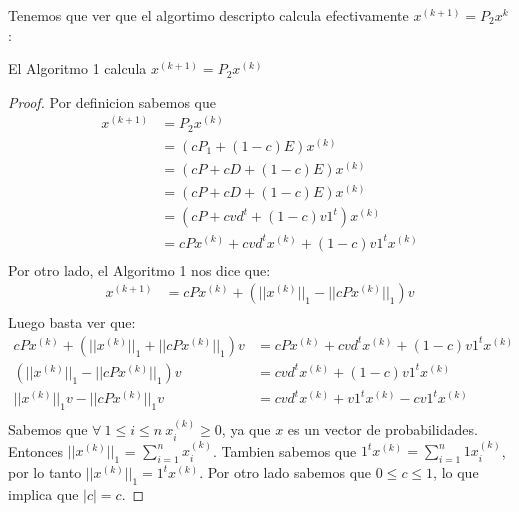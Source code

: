 Tenemos que ver que el algortimo descripto calcula efectivamente $x^{(k+1)} = P_2x^{k}$:
\begin{proposition}
    El Algoritmo 1 calcula $x^{(k+1)} = P_2x^{(k)}$
\end{proposition}
\begin{proof}
Por definicion sabemos que
  \begin{equation*}
            \begin{aligned}
              x^{(k+1)} &= P_2x^{(k)} \\
               &= (cP_1 +(1-c)E)x^{(k)} \\
               &= (cP + cD +(1-c)E)x^{(k)} \\
               &= (cP + cD +(1-c)E)x^{(k)} \\
               &= (cP + cvd^{t} +(1-c)v1^{t})x^{(k)} \\
               &= cPx^{(k)} + cvd^{t}x^{(k)} +(1-c)v1^{t}x^{(k)} \\
            \end{aligned}
\end{equation*}
Por otro lado, el Algoritmo 1 nos dice que:
\begin{equation*}
          \begin{aligned}
            x^{(k+1)} &= cPx^{(k)} + (||x^{(k)}||_1 - ||cPx^{(k)}||_1)v  \\
          \end{aligned}
\end{equation*}
Luego basta ver que:
\begin{equation*}
          \begin{aligned}
            cPx^{(k)} + (||x^{(k)}||_1 + ||cPx^{(k)}||_1)v &= cPx^{(k)} + cvd^{t}x^{(k)} +(1-c)v1^{t}x^{(k)}  \\
            (||x^{(k)}||_1 - ||cPx^{(k)}||_1)v &= cvd^{t}x^{(k)} +(1-c)v1^{t}x^{(k)}  \\
            ||x^{(k)}||_1v - ||cPx^{(k)}||_1v &= cvd^{t}x^{(k)} +v1^{t}x^{(k)} - cv1^{t}x^{(k)}  \\
          \end{aligned}
\end{equation*}
Sabemos que $\forall\ 1\leq i\leq n\ x^{(k)}_{i} \geq 0$, ya que $x$ es un vector de probabilidades. Entonces $||x^{(k)}||_1$ = $\sum\limits_{i=1}^{n}{x^{(k)}_{i}}$. Tambien sabemos que $1^{t}x^{(k)} = \sum\limits_{i=1}^{n}{1x^{(k)}_{i}}$, por lo tanto
$||x^{(k)}||_1 = 1^{t}x^{(k)}$.
\newline
Por otro lado sabemos que $0\leq c\leq 1$, lo que implica que $|c| = c$.

\end{proof}
